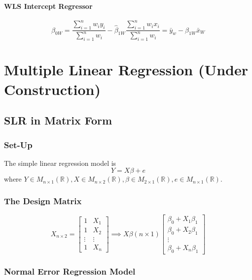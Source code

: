 \documentclass[11pt]{article}
\newcommand{\R}{\mathbb{R}}
\newcommand{\mat}[2]{M_{#1 \times #2}(\R)}
\begin{document}
\paragraph{WLS Intercept Regressor}
\begin{equation}
    \hat{\beta}_{0 W}=\frac{\sum_{i=1}^{n} w_{i} y_{i}}{\sum_{i=1}^{n} w_{i}}-\hat{\beta}_{1 W} \frac{\sum_{i=1}^{n} w_{i} x_{i}}{\sum_{i=1}^{n} w_{i}} = \bar{y}_{w}-\hat{\beta}_{1 W} \bar{x}_{W}
\end{equation}

\section{Multiple Linear Regression (Under Construction)}
\subsection{SLR in Matrix Form}
\subsubsection{Set-Up}
The simple linear regression model is
\begin{equation*}
    Y = X\beta + e
\end{equation*}
where $Y \in \mat{n}{1}, X\in \mat{n}{2}, \beta\in \mat{2}{1}, e\in \mat{n}{1}$.
\subsubsection{The Design Matrix}
\begin{equation*}
    X_{n\times 2} = \begin{bmatrix}
        1 & X_1 \\
        1 & X_2 \\
        \vdots & \vdots \\
        1 & X_n
    \end{bmatrix}
    \implies
    X\beta (n\times 1)
    \begin{bmatrix}
        \beta_0 + X_1 \beta_1 \\
        \beta_0 + X_2 \beta_1 \\
        \vdots \\
        \beta_0 + X_n \beta_1
    \end{bmatrix}
\end{equation*}

\subsubsection{Normal Error Regression Model}
\end{document}
